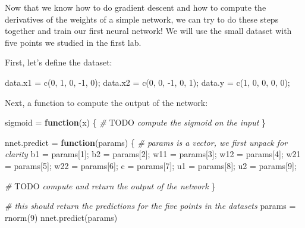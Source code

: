 \documentclass[
  a4paper,
]{article}
\newenvironment{Shaded}{\begin{snugshade}}{\end{snugshade}}
\newcommand{\AlertTok}[1]{\textcolor[rgb]{0.94,0.16,0.16}{#1}}
\newcommand{\CommentTok}[1]{\textcolor[rgb]{0.56,0.35,0.01}{\textit{#1}}}
\newcommand{\ControlFlowTok}[1]{\textcolor[rgb]{0.13,0.29,0.53}{\textbf{#1}}}
\newcommand{\DecValTok}[1]{\textcolor[rgb]{0.00,0.00,0.81}{#1}}
\newcommand{\FunctionTok}[1]{\textcolor[rgb]{0.00,0.00,0.00}{#1}}
\newcommand{\NormalTok}[1]{#1}
\newcommand{\OtherTok}[1]{\textcolor[rgb]{0.56,0.35,0.01}{#1}}
\newcommand{\SpecialCharTok}[1]{\textcolor[rgb]{0.00,0.00,0.00}{#1}}
\begin{document}
Now that we know how to do gradient descent and how to compute the
derivatives of the weights of a simple network, we can try to do these
steps together and train our first neural network! We will use the small
dataset with five points we studied in the first lab.

First, let's define the dataset:

\begin{Shaded}
\begin{Highlighting}[]
\NormalTok{data.x1 }\OtherTok{=} \FunctionTok{c}\NormalTok{(}\DecValTok{0}\NormalTok{, }\DecValTok{1}\NormalTok{, }\DecValTok{0}\NormalTok{, }\SpecialCharTok{{-}}\DecValTok{1}\NormalTok{, }\DecValTok{0}\NormalTok{);}
\NormalTok{data.x2 }\OtherTok{=} \FunctionTok{c}\NormalTok{(}\DecValTok{0}\NormalTok{, }\DecValTok{0}\NormalTok{, }\SpecialCharTok{{-}}\DecValTok{1}\NormalTok{, }\DecValTok{0}\NormalTok{, }\DecValTok{1}\NormalTok{);}
\NormalTok{data.y }\OtherTok{=} \FunctionTok{c}\NormalTok{(}\DecValTok{1}\NormalTok{, }\DecValTok{0}\NormalTok{, }\DecValTok{0}\NormalTok{, }\DecValTok{0}\NormalTok{, }\DecValTok{0}\NormalTok{);}
\end{Highlighting}
\end{Shaded}

Next, a function to compute the output of the network:

\begin{Shaded}
\begin{Highlighting}[]
\NormalTok{sigmoid }\OtherTok{=} \ControlFlowTok{function}\NormalTok{(x) \{}
  \CommentTok{\# }\AlertTok{TODO}\CommentTok{ compute the sigmoid on the input}
\NormalTok{\}}

\NormalTok{nnet.predict }\OtherTok{=} \ControlFlowTok{function}\NormalTok{(params) \{}
  \CommentTok{\# params is a vector, we first unpack for clarity}
\NormalTok{  b1 }\OtherTok{=}\NormalTok{ params[}\DecValTok{1}\NormalTok{]; b2 }\OtherTok{=}\NormalTok{ params[}\DecValTok{2}\NormalTok{];}
\NormalTok{  w11 }\OtherTok{=}\NormalTok{ params[}\DecValTok{3}\NormalTok{]; w12 }\OtherTok{=}\NormalTok{ params[}\DecValTok{4}\NormalTok{];}
\NormalTok{  w21 }\OtherTok{=}\NormalTok{ params[}\DecValTok{5}\NormalTok{]; w22 }\OtherTok{=}\NormalTok{ params[}\DecValTok{6}\NormalTok{];}
\NormalTok{  c }\OtherTok{=}\NormalTok{ params[}\DecValTok{7}\NormalTok{]; u1 }\OtherTok{=}\NormalTok{ params[}\DecValTok{8}\NormalTok{]; u2 }\OtherTok{=}\NormalTok{ params[}\DecValTok{9}\NormalTok{];}
  
  \CommentTok{\# }\AlertTok{TODO}\CommentTok{ compute and return the output of the network}
\NormalTok{\}}

\CommentTok{\# this should return the predictions for the five points in the datasets}
\NormalTok{params }\OtherTok{=} \FunctionTok{rnorm}\NormalTok{(}\DecValTok{9}\NormalTok{)}
\FunctionTok{nnet.predict}\NormalTok{(params)}
\end{Highlighting}
\end{Shaded}
\end{document}
